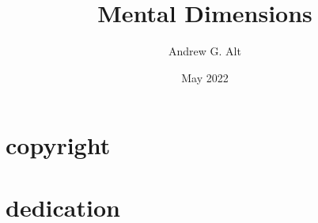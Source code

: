 \documentclass[draft,titlepage]{book}
\begin{document}
\author{Andrew G. Alt}
\title{Mental Dimensions}
\date{May 2022}


\frontmatter
\maketitle
\chapter{copyright}
\chapter{dedication}
\tableofcontents

\pagestyle{myheadings}
\mainmatter




\backmatter
\end{document}
